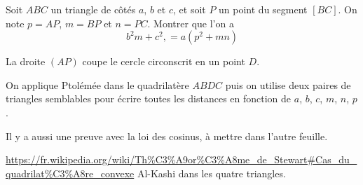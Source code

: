 \begin{exo}
Soit $ABC$ un triangle de côtés $a$, $b$ et $c$, et soit $P$ un point du segment $[BC]$. On note $p=AP$, $m=BP$ et $n=PC$.
Montrer que l'on a 
\[ b^2m+c^2,=a(p^2+mn)\]
\begin{hint}
La droite $(AP)$ coupe le cercle circonscrit en un point $D$. 
\end{hint}
\begin{sol}
On applique Ptolémée dans le quadrilatère $ABDC$ puis on utilise deux paires de triangles semblables pour écrire toutes les distances en fonction de $a$, $b$, $c$, $m$, $n$, $p$.

Il y a aussi une preuve avec la loi des cosinus, à mettre dans l'autre feuille.
\end{sol}
\end{exo}


\begin{exo}

\url{https://fr.wikipedia.org/wiki/Th%C3%A9or%C3%A8me_de_Stewart#Cas_du_quadrilat%C3%A8re_convexe}
Al-Kashi dans les quatre triangles.
\begin{hint}
\end{hint}
\begin{sol}
\end{sol}
\end{exo}


\begin{exo}
\begin{hint}
\end{hint}
\begin{sol}
\end{sol}
\end{exo}



\indications
\correction



